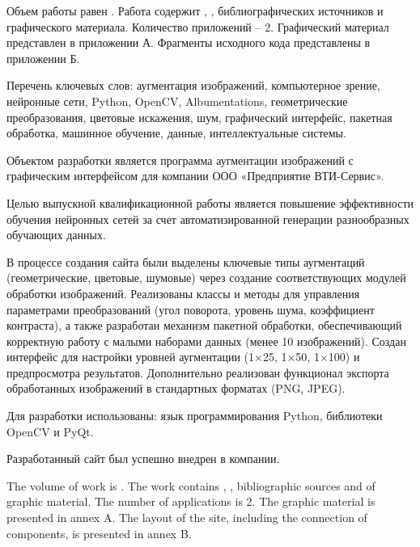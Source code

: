 
Объем работы равен . Работа содержит , ,  библиографических источников и  графического материала. Количество приложений – 2. Графический материал представлен в приложении А. Фрагменты исходного кода представлены в приложении Б.

Перечень ключевых слов: аугментация изображений, компьютерное зрение, нейронные сети, Python, OpenCV, Albumentations, геометрические преобразования, цветовые искажения, шум, графический интерфейс, пакетная обработка, машинное обучение, данные, интеллектуальные системы.

Объектом разработки является программа аугментации изображений с графическим интерфейсом для компании ООО «Предприятие ВТИ-Сервис».

Целью выпускной квалификационной работы является повышение эффективности обучения нейронных сетей за счет автоматизированной генерации разнообразных обучающих данных.

В процессе создания сайта были выделены ключевые типы аугментаций (геометрические, цветовые, шумовые) через создание соответствующих модулей обработки изображений. Реализованы классы и методы для управления параметрами преобразований (угол поворота, уровень шума, коэффициент контраста), а также разработан механизм пакетной обработки, обеспечивающий корректную работу с малыми наборами данных (менее 10 изображений). Создан интерфейс для настройки уровней аугментации (1×25, 1×50, 1×100) и предпросмотра результатов. Дополнительно реализован функционал экспорта обработанных изображений в стандартных форматах (PNG, JPEG).

Для разработки использованы: язык программирования Python, библиотеки OpenCV и PyQt.

Разработанный сайт был успешно внедрен в компании.

  
The volume of work is . The work contains , ,  bibliographic sources and  of graphic material. The number of applications is 2. The graphic material is presented in annex A. The layout of the site, including the connection of components, is presented in annex B.

